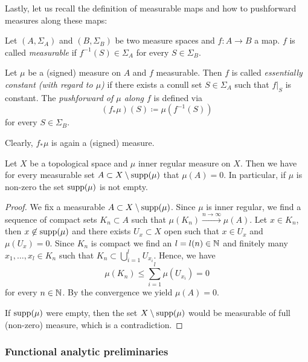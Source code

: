 Lastly, let us recall the definition of measurable maps and how to pushforward measures along these maps:

\begin{defin}
  \label{defin:pushforward}
  Let \((A, \Sigma_A)\) and \((B, \Sigma_B)\) be two measure spaces and \(f\colon A \to B\) a map. \(f\) is called \emph{measurable} if \(f^{-1}(S) \in \Sigma_A\) for every \(S \in \Sigma_B\).

  Let \(\mu\) be a (signed) measure on \(A\) and \(f\) measurable. Then \(f\) is called \emph{essentially constant (with regard to \(\mu\))} if there exists a conull set \(S \in \Sigma_A\) such that \(f|_S\) is constant. The \emph{pushforward of \(\mu\) along \(f\)} is defined via
  \[
    (f_\ast \mu)(S) \coloneqq \mu(f^{-1}(S))
  \]
  for every \(S \in \Sigma_B\).
\end{defin}

\begin{rem}
  Clearly, \(f_\ast\mu\) is again a (signed) measure.
\end{rem}

\begin{lemma}
  \label{lem:mu-supp}
  Let \(X\) be a topological space and \(\mu\) inner regular measure on \(X\). Then we have for every measurable set \(A \subset X \setminus \operatorname{supp}(\mu)\) that \(\mu(A) = 0\). In particular, if \(\mu\) is non-zero the set \(\operatorname{supp}(\mu)\) is not empty.
\end{lemma}

\begin{proof}
  We fix a measurable \(A \subset X \setminus \operatorname{supp}(\mu)\). Since \(\mu\) is inner regular, we find a sequence of compact sets \(K_n \subset A\) such that \(\mu(K_n) \xrightarrow{n \to \infty} \mu(A)\). Let \(x \in K_n\), then \(x \not \in \operatorname{supp}(\mu)\) and there exists \(U_x \subset X\) open such that \(x \in U_x\) and \(\mu(U_x) = 0\). Since \(K_n\) is compact we find an \(l = l(n) \in \mathbb{N}\) and finitely many \(x_1, \dots, x_l \in K_n\) such that \(K_n \subset \bigcup_{i=1}^l U_{x_i}\). Hence, we have
  \[
    \mu(K_n) \leq \sum_{i=1}^l \mu(U_{x_i}) = 0
  \]
  for every \(n \in \mathbb{N}\). By the convergence we yield \(\mu(A) = 0\).

  If \(\operatorname{supp}(\mu)\) were empty, then the set \(X \setminus \operatorname{supp}(\mu)\) would be measurable of full (non-zero) measure, which is a contradiction.
\end{proof}

\subsubsection*{Functional analytic preliminaries}
\label{sec:func-ana}

